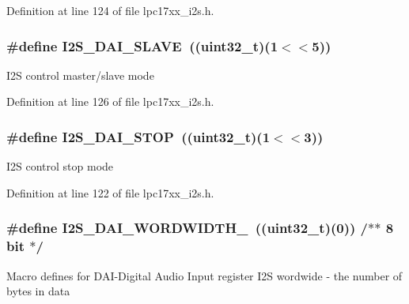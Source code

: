 \-Definition at line 124 of file lpc17xx\-\_\-i2s.\-h.

\hypertarget{group___i2_s___private___macros_ga664f6b8ac38d7b3a23aae4e7a2fa1c6f}{
\subsubsection[{\-I2\-S\-\_\-\-D\-A\-I\-\_\-\-S\-L\-A\-V\-E}]{\setlength{\rightskip}{0pt plus 5cm}\#define {\bf \-I2\-S\-\_\-\-D\-A\-I\-\_\-\-S\-L\-A\-V\-E}~((uint32\-\_\-t)(1$<$$<$5))}}\label{group___i2_s___private___macros_ga664f6b8ac38d7b3a23aae4e7a2fa1c6f}
\-I2\-S control master/slave mode 

\-Definition at line 126 of file lpc17xx\-\_\-i2s.\-h.

\hypertarget{group___i2_s___private___macros_ga2ed2d2a9f59339ad3cf1f28a78bfcad6}{
\subsubsection[{\-I2\-S\-\_\-\-D\-A\-I\-\_\-\-S\-T\-O\-P}]{\setlength{\rightskip}{0pt plus 5cm}\#define {\bf \-I2\-S\-\_\-\-D\-A\-I\-\_\-\-S\-T\-O\-P}~((uint32\-\_\-t)(1$<$$<$3))}}\label{group___i2_s___private___macros_ga2ed2d2a9f59339ad3cf1f28a78bfcad6}
\-I2\-S control stop mode 

\-Definition at line 122 of file lpc17xx\-\_\-i2s.\-h.

\hypertarget{group___i2_s___private___macros_ga8bd50ada05c4cd981f07be7a3b1002dc}{
\subsubsection[{\-I2\-S\-\_\-\-D\-A\-I\-\_\-\-W\-O\-R\-D\-W\-I\-D\-T\-H\-\_\-8}]{\setlength{\rightskip}{0pt plus 5cm}\#define {\bf \-I2\-S\-\_\-\-D\-A\-I\-\_\-\-W\-O\-R\-D\-W\-I\-D\-T\-H\-\_}~((uint32\-\_\-t)(0))		/$\ast$$\ast$ 8 bit	$\ast$/}}\label{group___i2_s___private___macros_ga8bd50ada05c4cd981f07be7a3b1002dc}
\-Macro defines for \-D\-A\-I-\/\-Digital \-Audio \-Input register \-I2\-S wordwide -\/ the number of bytes in data 

